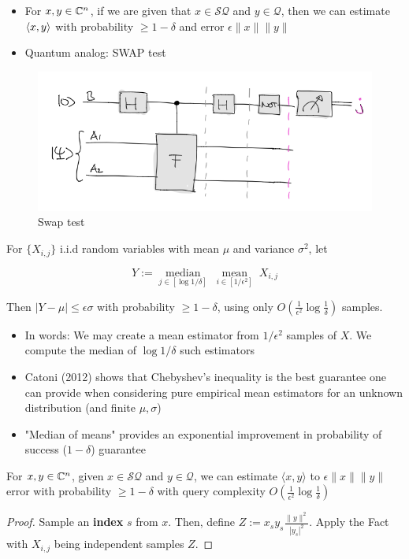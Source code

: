 \documentclass[main.tex]{subfiles}
\begin{document}
\begin{itemize}
	\item For $x, y \in \mathbb{C}^n$, if we are given that $x \in \mathcal{SQ}$ and $y \in \mathcal{Q}$, then we can estimate $\langle x, y\rangle$ with probability $\geq 1 - \delta$ and error $\epsilon \|x\|\|y\|$ 
	\item Quantum analog: SWAP test
\end{itemize}

\begin{figure}
\includegraphics[width= 0.5\linewidth]{images/swap_test.png}	
\caption{Swap test}
\end{figure}

\begin{fact} For $\{X_{i,j}\}$ i.i.d random variables with mean $\mu$ and variance $\sigma^2$, let 

$$Y := \underset{j \in [\log 1/\delta]}{\operatorname{median}}\;\underset{i \in [1/\epsilon^2]}{\operatorname{mean}}\;X_{i,j}$$

Then $\vert Y - \mu\vert \leq \epsilon\sigma$ with probability $\geq 1-\delta$, using only $O(\frac{1}{\epsilon^2}\log\frac{1}{\delta})$ samples.
\end{fact}

\begin{itemize}
	\item In words: We may create a mean estimator from $1/\epsilon^2$ samples of $X$. We compute the median of $\log 1/\delta$ such estimators
	\item Catoni (2012) shows that Chebyshev's inequality is the best guarantee one can provide when considering pure empirical mean estimators for an unknown distribution (and finite $\mu, \sigma$)
	\item "Median of means" provides an exponential improvement in probability of success ($1 - \delta$) guarantee
\end{itemize}

\begin{corollary} For $x,y \in\mathbb{C}^n$, given $x \in \mathcal{SQ}$ and $y \in \mathcal{Q}$, we can estimate $\langle x,y\rangle$ to $\epsilon\|x\|\|y\|$ error with probability $\geq 1-\delta$ with query complexity $O(\frac{1}{\epsilon^2}\log\frac{1}{\delta})$
\end{corollary}
\begin{proof}Sample an \textbf{index} $s$ from $x$. Then, define $Z := x_s y_s\frac{\|y\|^2}{|y_s|^2}$. Apply the Fact with $X_{i,j}$ being independent samples $Z$.
\end{proof}	
\end{document}

